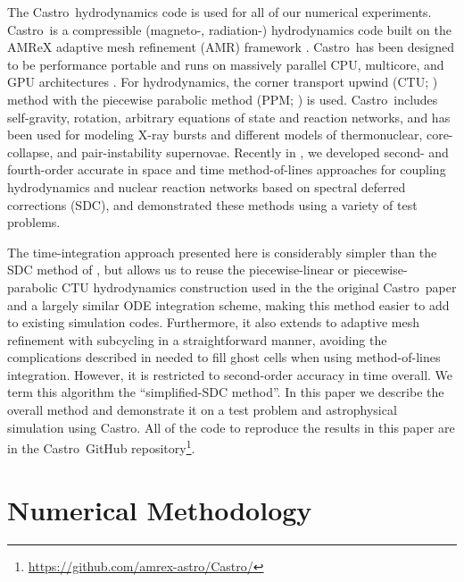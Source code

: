 \documentclass[linenumbers,trackchanges]{aastex631}
\newcommand{\castro}{{\sf Castro}}
\newcommand{\MarginPar}[1]{\marginpar{\vskip-\baselineskip\raggedright\tiny\sffamily\hrule\smallskip{\color{red}#1}\par\smallskip\hrule}}
\begin{document}
The \castro\ hydrodynamics code \citep{castro,castro_joss} is used for
all of our numerical experiments.  \castro\ is a compressible
(magneto-, radiation-) hydrodynamics code built on the AMReX adaptive
mesh refinement (AMR) framework \citep{amrex_joss}.  \castro\ has been
designed to be performance portable and runs on massively parallel CPU,
multicore, and GPU architectures \citep{castro_gpu}.  For hydrodynamics, the
corner transport upwind (CTU; \citealt{ppmunsplit}) method with the
piecewise parabolic method (PPM; \citealt{ppm,millercolella:2002}) is
used.  \castro\ includes self-gravity, rotation, arbitrary equations
of state and reaction networks, and has been used for modeling X-ray
bursts and different models of thermonuclear, core-collapse, and
pair-instability supernovae.  Recently in \citet{castro_sdc}, we
developed second- and fourth-order accurate in space and time
method-of-lines approaches for coupling hydrodynamics and nuclear reaction networks based on
spectral deferred corrections (SDC), and demonstrated these
methods using a variety of test problems.

The time-integration approach presented here is considerably simpler
than the SDC method of \citet{castro_sdc}, but allows us to reuse the
piecewise-linear or piecewise-parabolic CTU hydrodynamics
construction \citep{saltzman1994,millercolella:2002}
used in the the original \castro\ paper
and a largely similar ODE integration scheme, making this
method easier to add to existing simulation codes.  Furthermore, it
also extends to adaptive mesh refinement with subcycling in a
straightforward manner, avoiding the complications described in
\cite{mccorquodalecolella} needed to fill ghost cells when using
method-of-lines integration.  However, it is restricted to
second-order accuracy in time overall.  We term this algorithm the
``simplified-SDC method''.  In this paper we describe the overall
method and demonstrate it on a test problem and astrophysical
simulation using \castro.  All of the code to reproduce the results in
this paper are in the \castro\ GitHub
repository\footnote{\url{https://github.com/amrex-astro/Castro/}}.

\section{Numerical Methodology}
\end{document}
